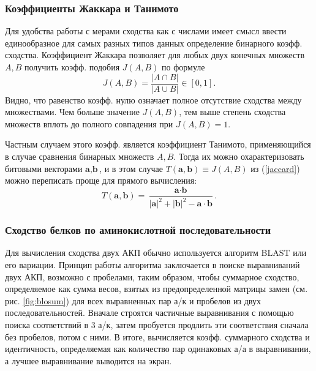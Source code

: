 \documentclass[a4paper,14pt]{article}         %
\begin{document}
\subsubsection{Коэффициенты Жаккара и Танимото} \label{sec:tanim}
Для удобства работы с мерами сходства как с числами имеет смысл ввести единообразное для самых разных типов данных определение бинарного коэфф. сходства. Коэффициент Жаккара \cite{Jaccard1901} позволяет для любых двух конечных множеств $A, B$ получить коэфф. подобия $J(A, B)$ по формуле
\begin{equation}
\label{jaccard}
J(A, B) = \frac{|A\cap B|}{|A\cup B|} \in [0, 1].
\end{equation}
Видно, что равенство коэфф. нулю означает полное отсутствие сходства между множествами. Чем больше значение $J(A, B)$, тем выше степень сходства множеств вплоть до полного совпадения при $J(A, B) = 1$.

Частным случаем этого коэфф. является коэффициент Танимото, применяющийся в случае сравнения бинарных множеств $A, B$. Тогда их можно охарактеризовать битовыми векторами $\textbf{a}, \textbf{b}$, и в этом случае \linebreak $T(\textbf{a}, \textbf{b}) \equiv J(A, B) $ из (\ref{jaccard}) можно переписать проще для прямого вычисления:
\begin{equation}
T(\textbf{a}, \textbf{b}) = \frac{\textbf{a}\cdot\textbf{b}}{|\textbf{a}|^2 + |\textbf{b}|^2 - \textbf{a}\cdot\textbf{b}}.
\end{equation}

\subsubsection{Сходство белков по аминокислотной последовательности}
Для вычисления сходства двух АКП обычно используется алгоритм BLAST \cite{ALTSCHUL1990403} или его вариации. Принцип работы алгоритма заключается в поиске выравниваний двух АКП, возможно с пробелами, таким образом, чтобы суммарное сходство, определяемое как сумма весов, взятых из предопределенной матрицы замен (см. рис. \ref{fig:blosum}) для всех выравненных пар а/к и пробелов из двух последовательностей. Вначале строятся частичные выравнивания с помощью поиска соответствий в 3 а/к, затем пробуется продлить эти соответствия сначала без пробелов, потом с ними. В итоге, вычисляется коэфф. суммарного сходства и идентичность, определяемая как количество пар одинаковых а/а в выравнивании, а лучшее выравнивание выводится на экран.
\end{document}
